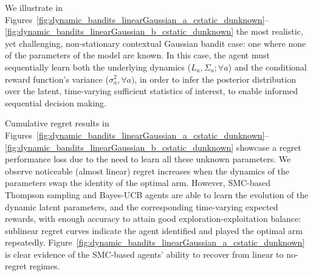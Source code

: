 We illustrate in Figures~\ref{fig:dynamic_bandits_linearGaussian_a_cstatic_dunknown}--\ref{fig:dynamic_bandits_linearGaussian_b_cstatic_dunknown}
the most realistic, yet challenging, non-stationary contextual Gaussian bandit case:
one where none of the parameters of the model are known.
In this case, the agent must sequentially learn both the underlying dynamics ($L_a,\Sigma_a; \forall a$)
and the conditional reward function's variance ($\sigma_a^2, \forall a)$,
in order to infer the posterior distribution over the latent, time-varying sufficient statistics of interest,
to enable informed sequential decision making.

Cumulative regret results in Figures~\ref{fig:dynamic_bandits_linearGaussian_a_cstatic_dunknown}--\ref{fig:dynamic_bandits_linearGaussian_b_cstatic_dunknown}
showcase a regret performance loss due to the need to learn all these unknown parameters.
We observe noticeable (almost linear) regret increases when the dynamics of the parameters swap the identity of the optimal arm.
However, SMC-based Thompson sampling and Bayes-UCB agents are able to learn the evolution of the dynamic latent parameters,
and the corresponding time-varying expected rewards,
with enough accuracy to attain good exploration-exploitation balance:
\ie sublinear regret curves indicate the agent identified and played the optimal arm repeatedly.
Figure~\ref{fig:dynamic_bandits_linearGaussian_a_cstatic_dunknown} is clear evidence of the SMC-based agents' ability to recover from linear to no-regret regimes.

